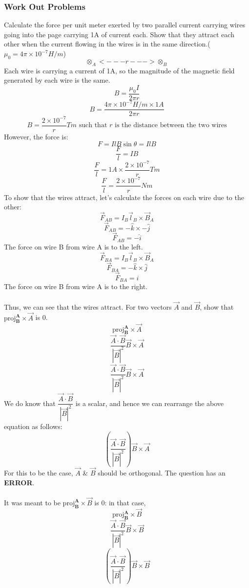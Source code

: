 \documentclass[12pt,addpoints]{exam}
\begin{document}
{{{\begin{questions}
					\subsubsection*{Work Out Problems}
					\question Calculate the force per unit meter exerted by two parallel current carrying wires going into the page carrying 1A of current each. Show that they attract each other when the current flowing in the wires is in the same direction.($\mu_0=4\pi\times10^{-7}H/m$) \\
					$$\otimes_A<---r--->\otimes_B$$
					Each wire is carrying a current of 1A, so the magnitude of the magnetic field generated by each wire is the same.
					$$B=\dfrac{\mu_0I}{2\pi r}$$
					$$B=\dfrac{4\pi\times10^{-7}H/m\times1A}{2\pi r}$$
					$$B=\dfrac{2\times10^{-7}}{r}Tm\text{  such that }r\text{ is the distance between the two wires}$$
					However, the force is:
					$$F=IlB\sin\theta=IlB$$
					$$\dfrac{F}{l}=IB$$
					$$\dfrac{F}{l}=1A\times\dfrac{2\times10^{-7}}{r}Tm$$
					$$\dfrac{F}{l}=\dfrac{2\times10^{-7}}{r}Nm$$
					To show that the wires attract, let's calculate the forces on each wire due to the other:
					$$\vec{F}_{AB}=I_B\vec{l}_B\times \vec{B}_A$$
					$$\vec{F}_{AB}=-\hat{k}\times-\hat{j}$$
					$$\vec{F}_{AB}=-\hat{i}$$
					The force on wire B from wire A is to the left.
					$$\vec{F}_{BA}=I_B\vec{l}_B\times \vec{B}_A$$
					$$\vec{F}_{BA}=-\hat{k}\times\hat{j}$$
					$$\vec{F}_{BA}=\hat{i}$$
					The force on wire B from wire A is to the right. \\ \\
					Thus, we can see that the wires attract.
					\question For two vectors $\vec{A}$ and $\vec{B}$, show that $\text{proj}^\textbf{A}_{\textbf{B}}\times\vec{A}$ is 0. 
					$$\text{proj}^\textbf{A}_{\textbf{B}}\times\vec{A}$$
					$$\dfrac{\vec{A}\cdot\vec{B}}{|\vec{B}|^2}\vec{B}\times\vec{A}$$
					$$\dfrac{\vec{A}\cdot\vec{B}}{|\vec{B}|^2}\vec{B}\times\vec{A}$$
					We do know that $\dfrac{\vec{A}\cdot\vec{B}}{|\vec{B}|^2}$ is a scalar, and hence we can rearrange the above equation as follows:
					$$(\dfrac{\vec{A}\cdot\vec{B}}{|\vec{B}|^2})\vec{B}\times\vec{A}$$
					For this to be the case, $\vec{A}$ \& $\vec{B}$ should be orthogonal. The question has an \textbf{ERROR}. \\ \\
					It was meant to be $\text{proj}^\textbf{A}_{\textbf{B}}\times\vec{B}$ is 0: in that case,
					$$\text{proj}^\textbf{A}_{\textbf{B}}\times\vec{B}$$
					$$\dfrac{\vec{A}\cdot\vec{B}}{|\vec{B}|^2}\vec{B}\times\vec{B}$$
					$$(\dfrac{\vec{A}\cdot\vec{B}}{|\vec{B}|^2})\vec{B}\times\vec{B}$$

\end{questions}}}}
\end{document}
